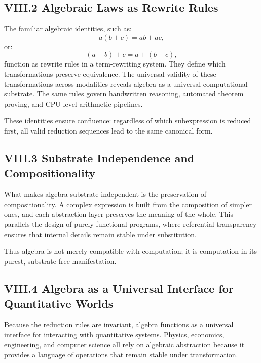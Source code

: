 \documentclass[12pt,letterpaper]{article}
\begin{document}
\subsection{VIII.2 Algebraic Laws as Rewrite Rules}

The familiar algebraic identities, such as:
\[
a(b + c) = ab + ac,
\]
or:
\[
(a + b) + c = a + (b + c),
\]
function as rewrite rules in a term-rewriting system. They define which transformations preserve equivalence. The universal validity of these transformations across modalities reveals algebra as a universal computational substrate. The same rules govern handwritten reasoning, automated theorem proving, and CPU-level arithmetic pipelines.

These identities ensure confluence: regardless of which subexpression is reduced first, all valid reduction sequences lead to the same canonical form.

\subsection{VIII.3 Substrate Independence and Compositionality}

What makes algebra substrate-independent is the preservation of compositionality. A complex expression is built from the composition of simpler ones, and each abstraction layer preserves the meaning of the whole. This parallels the design of purely functional programs, where referential transparency ensures that internal details remain stable under substitution.

Thus algebra is not merely compatible with computation; it is computation in its purest, substrate-free manifestation.

\subsection{VIII.4 Algebra as a Universal Interface for Quantitative Worlds}

Because the reduction rules are invariant, algebra functions as a universal interface for interacting with quantitative systems. Physics, economics, engineering, and computer science all rely on algebraic abstraction because it provides a language of operations that remain stable under transformation.
\end{document}
